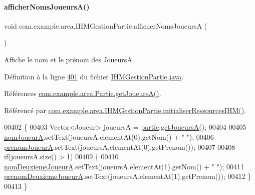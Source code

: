 \paragraph{\texorpdfstring{afficher\+Noms\+Joueurs\+A()}{afficherNomsJoueursA()}}
{\footnotesize\ttfamily void com.\+example.\+area.\+I\+H\+M\+Gestion\+Partie.\+afficher\+Noms\+JoueursA (\begin{DoxyParamCaption}{ }\end{DoxyParamCaption})\hspace{0.3cm}{\ttfamily [private]}}



Affiche le nom et le prénom des JoueursA. 



Définition à la ligne \hyperlink{_i_h_m_gestion_partie_8java_source_l00401}{401} du fichier \hyperlink{_i_h_m_gestion_partie_8java_source}{I\+H\+M\+Gestion\+Partie.\+java}.



Références \hyperlink{_partie_8java_source_l00064}{com.\+example.\+area.\+Partie.\+get\+Joueurs\+A()}.



Référencé par \hyperlink{_i_h_m_gestion_partie_8java_source_l00223}{com.\+example.\+area.\+I\+H\+M\+Gestion\+Partie.\+initialiser\+Ressources\+I\+H\+M()}.


\begin{DoxyCode}
00402     \{
00403         Vector<Joueur> joueursA = \hyperlink{classcom_1_1example_1_1area_1_1_i_h_m_gestion_partie_a225e150f813f8fa5c632709a57eacc32}{partie}.\hyperlink{classcom_1_1example_1_1area_1_1_partie_a0f944de317206d9b99f9ffc7146a43ef}{getJoueursA}();
00404 
00405         \hyperlink{classcom_1_1example_1_1area_1_1_i_h_m_gestion_partie_ad7ac57a177098fba4ba7ea29a2418f10}{nomJoueurA}.setText(joueursA.elementAt(0).getNom() + \textcolor{stringliteral}{" "});
00406         \hyperlink{classcom_1_1example_1_1area_1_1_i_h_m_gestion_partie_a9a5b0bc9c6f1d865b85bfe789219e16e}{prenomJoueurA}.setText(joueursA.elementAt(0).getPrenom());
00407 
00408         \textcolor{keywordflow}{if}(joueursA.size() > 1)
00409         \{
00410             \hyperlink{classcom_1_1example_1_1area_1_1_i_h_m_gestion_partie_a00dbc2ac1396af550520dd011d8e01cc}{nomDeuxiemeJoueurA}.setText(joueursA.elementAt(1).getNom() + \textcolor{stringliteral}{" "});
00411             \hyperlink{classcom_1_1example_1_1area_1_1_i_h_m_gestion_partie_af209e9cda709137d8b77170a35b295e0}{prenomDeuxiemeJoueurA}.setText(joueursA.elementAt(1).getPrenom());
00412         \}
00413     \}
\end{DoxyCode}
\mbox{\label{classcom_1_1example_1_1area_1_1_i_h_m_gestion_partie_a55e51d83d01ea0c3c6400f6419edfd06}} 

